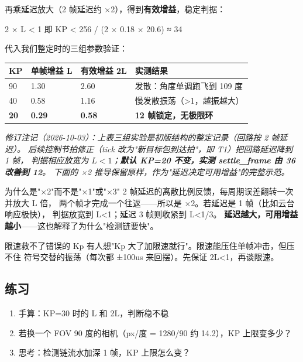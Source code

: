 \documentclass[11pt]{ctexart}
\begin{document}
再乘延迟放大（2 帧延迟约 ×2），得到\textbf{有效增益}，稳定判据：

\begin{Verilog}
2 × L < 1    即    KP < 256 / (2 × 0.18 × 20.6) ≈ 34
\end{Verilog}

代入我们整定时的三组参数验证：

\begin{center}
\begin{tabular}{llll}
\toprule
\rowcolor{rowtint}\textbf{KP} & \textbf{单帧增益 L} & \textbf{有效增益 2L} & \textbf{实测结果} \\
\midrule
90   & 1.30 & 2.60 & 发散：角度单调跑飞到 109 度 \\
40   & 0.58 & 1.16 & 慢发散振荡（>1，越振越大） \\
\textbf{20}   & \textbf{0.29} & \textbf{0.58} & \textbf{12 帧锁定，无极限环} \\
\bottomrule
\end{tabular}
\end{center}

\textit{修订注记（2026-10-03）：上表三组实验是初版结构的整定记录（回路按 2 帧延迟）。
后续控制节拍修正（tick 改为"新目标包到达拍"，即 T1）把回路延迟降到 1 帧，
判据相应放宽为 $L<1$；\textbf{默认 KP=20 不变，实测 settle\_frame 由 36 改善到 12}。
下面的 ×2 推导保留原样，作为"延迟决定可用增益"的完整示范。}

\begin{keybox}{为什么是"×2"而不是"×1"或"×3"}
2 帧延迟的离散比例反馈，每周期误差翻转一次并放大 L 倍，
两个帧才完成一个往返——所以是 ×2。若延迟是 1 帧（比如云台响应极快），
判据放宽到 L<1；延迟 3 帧则收紧到 L<1/3。
\textbf{延迟越大，可用增益越小}——这也解释了为什么"检测链要快"。
\end{keybox}

\begin{warnbox}{限速救不了错误的 Kp}
有人想"Kp 大了加限速就行"。限速能压住单帧冲击，但压不住
符号交替的振荡（每次都 ±100us 来回摆）。先保证 2L<1，再谈限速。
\end{warnbox}

\subsection{练习}

\begin{enumerate}
  \item 手算：KP=30 时的 L 和 2L，判断稳不稳
  \item 若换一个 FOV 90 度的相机（px/度 = 1280/90 约 14.2），KP 上限变多少？
  \item 思考：检测链流水加深 1 帧，KP 上限怎么变？
\end{enumerate}
\end{document}
